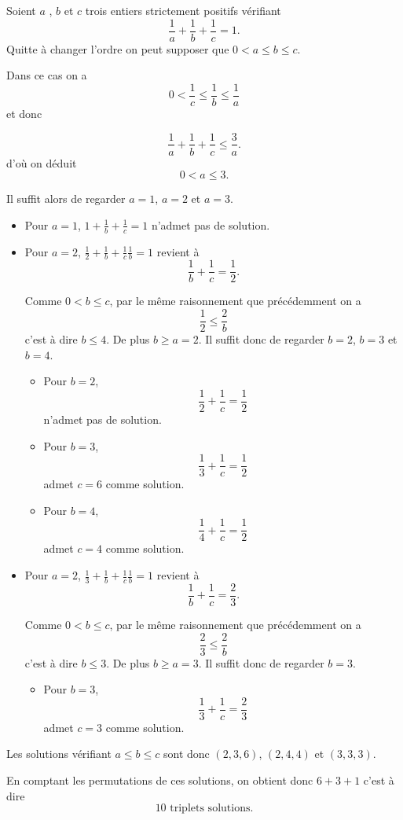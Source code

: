 \begin{sol}
  Soient $a$ , $b$ et $c$ trois entiers strictement positifs vérifiant
  \[\frac{1}{a} + \frac{1}{b} + \frac{1}{c} = 1.\]
  Quitte à changer l'ordre on peut supposer que $0 < a \leq b \leq c$.

  Dans ce cas on a
  \[0 < \frac{1}{c} \leq \frac{1}{b} \leq \frac{1}{a}\]
  et donc

  \[\frac{1}{a} + \frac{1}{b}  + \frac{1}{c}\leq \frac{3}{a}.\]
  d'où on déduit
  \[0 < a \leq 3.\]

  Il suffit alors de regarder $a = 1$, $a=2$ et  $a=3$.

  \begin{itemize}
    \item Pour $a=1$, $1+\frac{1}{b} + \frac{1}{c} = 1$ n'admet pas de solution.
    \item Pour $a=2$, $\frac{1}{2}+\frac{1}{b} + \frac{1}{c} \frac{1}{b}  = 1$ revient à
          \[\frac{1}{b} + \frac{1}{c} = \frac{1}{2}.\]

          Comme $0 < b \leq c$, par le même raisonnement que précédemment on a
          \[\frac{1}{2} \leq \frac{2}{b}\]
          c'est à dire $b \leq 4$. De plus $b \geq a = 2$. Il suffit donc de regarder $b=2$, $b=3$ et $b=4$.
          \begin{itemize}
            \item Pour $b=2$, \[\frac{1}{2} + \frac{1}{c} = \frac{1}{2}\] n'admet pas de solution.
            \item Pour $b=3$, \[\frac{1}{3} + \frac{1}{c} = \frac{1}{2}\] admet $c=6$ comme solution.
            \item Pour $b=4$, \[\frac{1}{4} + \frac{1}{c} = \frac{1}{2}\] admet $c=4$ comme solution.
          \end{itemize}
    \item Pour $a=2$, $\frac{1}{3}+\frac{1}{b} + \frac{1}{c} \frac{1}{b}  = 1$ revient à
          \[\frac{1}{b} + \frac{1}{c} = \frac{2}{3}.\]

          Comme $0 < b \leq c$, par le même raisonnement que précédemment on a
          \[\frac{2}{3} \leq \frac{2}{b}\]
          c'est à dire $b \leq 3$. De plus $b \geq a = 3$. Il suffit donc de regarder $b=3$.
          \begin{itemize}
            \item Pour $b=3$, \[\frac{1}{3} + \frac{1}{c} = \frac{2}{3}\] admet $c=3$ comme solution.
          \end{itemize}
  \end{itemize}


  Les solutions vérifiant $a \leq b \leq c$ sont donc $(2,3,6)$, $(2,4,4)$ et $(3,3,3)$.

  En comptant les permutations de ces solutions, on obtient donc $6+3+1$ c'est à dire
  \[\boxed{10 \text{ triplets solutions}}.\]
\end{sol}


